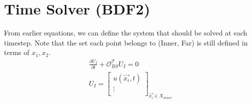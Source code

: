 \documentclass[a4paper]{article}      %
\begin{document}
\section*{Time Solver (BDF2)}
From earlier equations, we can define the system that should be solved at each timestep. Note that the set each point belongs to (Inner, Far) is still defined in terms of $x_1, x_2$.
\begin{equation}
	\begin{gathered}
 		\frac{\partial U_I}{\partial t} + \mathcal{O}_{BS}^\mathcal{T} U_I = 0 \\
 	U_I = \begin{bmatrix} 
 	u(\vec{x_i}, t) \\ 
 	\vdots \\
	\end{bmatrix} _{\vec{x_i} \in X_{inner}}	 
 	\end{gathered} 	 
\end{equation}
\end{document}
